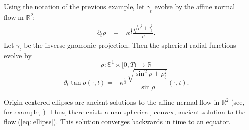 \documentclass{amsart}
\begin{document}
\begin{example}
Using the notation of the previous example, let $\bar{\gamma}_t$ evolve by the affine normal flow in $\mathbb{R}^2:$
\begin{align*}
\partial_t\bar{\rho}&=-\bar{\kappa}^{\frac{1}{3}}\frac{\sqrt{\bar{\rho}^2+\bar{\rho}_{\theta}^2}}{\bar{\rho}}.
\end{align*}
Let \(\gamma_t\) be the inverse gnomonic projection. Then the spherical radial functions evolve by
\[\rho:\mathbb{S}^1\times[0,T)\to \mathbb{R}\]
\begin{equation}\label{eq: ellipse}
\partial_t\tan\rho(\cdot,t)=-\kappa^{\frac{1}{3}} \frac{\sqrt{\sin^2\rho+\rho_{\theta}^2}}{\sin\rho}(\cdot,t).
\end{equation}

Origin-centered ellipses are ancient solutions to the affine normal flow in $\mathbb{R}^2$ (see, for example, \cite{Ivaki:01/2016}). Thus, there exists a non-spherical, convex, ancient solution to the flow (\ref{eq: ellipse}). This solution converges backwards in time to an equator.
\end{example}


\end{document}
